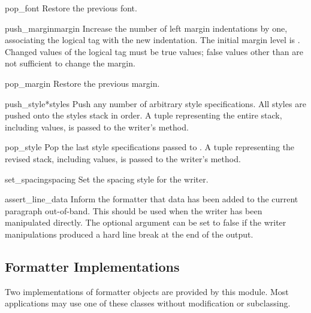 \begin{funcdesc}{pop_font}{}
Restore the previous font.
\end{funcdesc}

\begin{funcdesc}{push_margin}{margin}
Increase the number of left margin indentations by one, associating
the logical tag  with the new indentation.  The initial
margin level is .  Changed values of the logical tag must be
true values; false values other than  are not sufficient
to change the margin.
\end{funcdesc}

\begin{funcdesc}{pop_margin}{}
Restore the previous margin.
\end{funcdesc}

\begin{funcdesc}{push_style}{*styles}
Push any number of arbitrary style specifications.  All styles are
pushed onto the styles stack in order.  A tuple representing the
entire stack, including  values, is passed to the writer's
 method.
\end{funcdesc}

\begin{funcdesc}{pop_style}{}
Pop the last  style specifications passed to
.  A tuple representing the revised stack,
including  values, is passed to the writer's
 method.
\end{funcdesc}

\begin{funcdesc}{set_spacing}{spacing}
Set the spacing style for the writer.
\end{funcdesc}

\begin{funcdesc}{assert_line_data}{}
Inform the formatter that data has been added to the current paragraph
out-of-band.  This should be used when the writer has been manipulated
directly.  The optional  argument can be set to false if
the writer manipulations produced a hard line break at the end of the
output.
\end{funcdesc}


\subsection{Formatter Implementations}

Two implementations of formatter objects are provided by this module.
Most applications may use one of these classes without modification or
subclassing.

